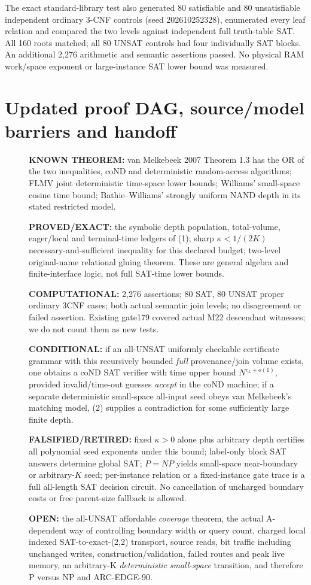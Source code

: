 \documentclass[11pt]{article}
\begin{document}
The exact standard-library test also generated 80 satisfiable and
80 unsatisfiable independent ordinary 3-CNF controls (seed
202610252328), enumerated every leaf relation and compared the two
levels against independent full truth-table SAT. All 160 roots matched;
all 80 UNSAT controls had four individually SAT blocks. An additional
2,276 arithmetic and semantic assertions passed. No physical RAM
work/space exponent or large-instance SAT lower bound was measured.

\section{Updated proof DAG, source/model barriers and handoff}
\begin{description}
\item[] \textbf{KNOWN THEOREM:} van Melkebeek 2007 Theorem 1.3 has the
OR of the two inequalities, coND and deterministic random-access
algorithms; FLMV joint deterministic time-space lower bounds; Williams'
small-space cosine time bound; Bathie--Williams' strongly uniform NAND
depth in its stated restricted model.
\item[] \textbf{PROVED/EXACT:} the symbolic depth population, total-volume,
eager/local and terminal-time ledgers of (1); sharp \(\kappa<1/(2K)\)
necessary-and-sufficient inequality for this declared budget; two-level
original-name relational gluing theorem. These are general algebra and
finite-interface logic, not full SAT-time lower bounds.
\item[] \textbf{COMPUTATIONAL:} 2,276 assertions; 80 SAT, 80 UNSAT
proper ordinary 3CNF cases; both actual semantic join levels;
no disagreement or failed assertion. Existing gate179 covered actual
M22 descendant witnesses; we do not count them as new tests.
\item[] \textbf{CONDITIONAL:} if an all-UNSAT uniformly checkable
certificate grammar with this recursively bounded \emph{full}
provenance/join volume exists, one obtains a coND SAT verifier with
time upper bound $N^{c_L+o(1)}$, provided invalid/time-out guesses
\emph{accept} in the coND machine; if a separate deterministic small-space
all-input seed obeys van Melkebeek's matching model, (2) supplies a
contradiction for some sufficiently large finite depth.
\item[] \textbf{FALSIFIED/RETIRED:} fixed $\kappa>0$ alone plus arbitrary
depth certifies all polynomial seed exponents under this bound;
label-only block SAT answers determine global SAT;
$P=NP$ yields small-space near-boundary or arbitrary-$K$ seed;
per-instance relation or a fixed-instance gate trace is a full
all-length SAT decision circuit. No cancellation of uncharged boundary
costs or free parent-size fallback is allowed.
\item[] \textbf{OPEN:} the all-UNSAT affordable \emph{coverage} theorem,
the actual A-dependent way of controlling boundary width or query count,
charged local indexed SAT-to-exact-(2,2) transport, source reads,
bit traffic including unchanged writes, construction/validation,
failed routes and peak live memory, an arbitrary-K \emph{deterministic}
\emph{small-space} transition, and therefore P versus NP and ARC-EDGE-90.
\end{description}
\end{document}
